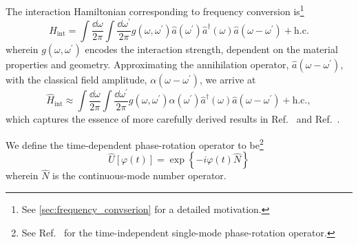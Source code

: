





The interaction Hamiltonian corresponding to frequency conversion is\footnote{See \cref{sec:frequency_convserion} for a detailed motivation.}
\begin{equation}
	\hat{H}_\text{int}
	=
	\int\frac{\dd{\omega}}{2\pi}
	\int\frac{\dd{\omega^\prime}}{2\pi}
	g(\omega,\omega^\prime)
	\hat{a}(\omega^\prime)
	\hat{a}^\dagger(\omega)
	\hat{a}(\omega-\omega^\prime)
	+
	\text{h.c.}
\end{equation}
wherein $g(\omega,\omega^\prime)$ encodes the interaction strength, dependent on the material properties and geometry.
Approximating the annihilation operator, $\hat{a}(\omega-\omega^\prime)$, with the classical field amplitude, $\alpha(\omega-\omega^\prime)$, we arrive at
\begin{equation}
	\hat{H}_\text{int}
	\approx
	\int\frac{\dd{\omega}}{2\pi}
	\int\frac{\dd{\omega^\prime}}{2\pi}
	g(\omega,\omega^\prime)
	\alpha(\omega^\prime)
	\hat{a}^\dagger(\omega)
	\hat{a}(\omega-\omega^\prime)
	+
	\text{h.c.}
	,
\end{equation}
which captures the essence of more carefully derived results in Ref.~\cite[eq.~35]{Horoshko2018} and Ref.~\cite[p.~89]{QuesadaMejia2015}.

We define the time-dependent phase-rotation operator to be\footnote{See Ref.~\cite[p.~103]{Vogel2006} for the time-independent single-mode phase-rotation operator.}
\begin{equation}
	\hat{U}\left[\varphi(t)\right]
	=
	\exp\left\{
		-i\varphi(t)
		\hat{N}
	\right\}
\end{equation}
wherein $\hat{N}$ is the continuous-mode number operator.

